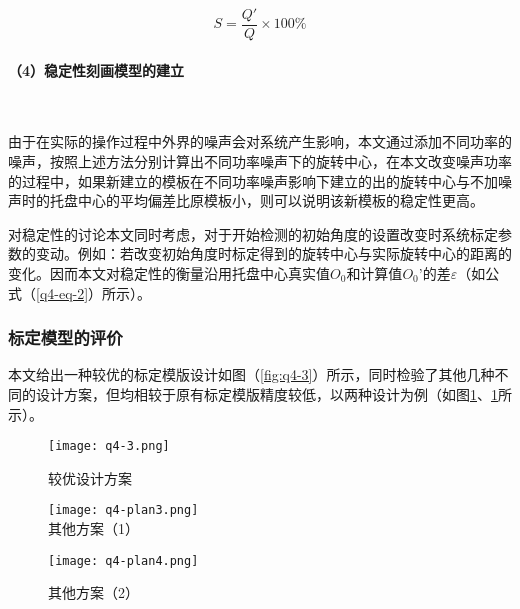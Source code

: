 \documentclass[withoutpreface,bwprint]{cumcmthesis} %
\begin{document}
\begin{equation}
	\label{q4-eq-2}
	S = \frac{Q'}{Q} \times 100\%
\end{equation}

\paragraph*{（4）稳定性刻画模型的建立}~\\

\par 由于在实际的操作过程中外界的噪声会对系统产生影响，本文通过添加不同功率的噪声，按照上述方法分别计算出不同功率噪声下的旋转中心，在本文改变噪声功率的过程中，如果新建立的模板在不同功率噪声影响下建立的出的旋转中心与不加噪声时的托盘中心的平均偏差比原模板小，则可以说明该新模板的稳定性更高。
\par 对稳定性的讨论本文同时考虑，对于开始检测的初始角度的设置改变时系统标定参数的变动。例如：若改变初始角度时标定得到的旋转中心与实际旋转中心的距离的变化。因而本文对稳定性的衡量沿用托盘中心真实值$O_0$和计算值$O_0’$的差$\varepsilon$（如公式（\ref{q4-eq-2}）所示）。

\subsubsection{标定模型的评价}
本文给出一种较优的标定模版设计如图（\ref{fig:q4-3}）所示，同时检验了其他几种不同的设计方案，但均相较于原有标定模版精度较低，以两种设计为例（如图\ref{fig:q4-3-1}、\ref{fig:q4-3-1}所示）。

\begin{figure}[!htbp]  
\begin{minipage}[t]{0.3\textwidth}
\centering  
\texttt{[image: q4-3.png]}
\caption{较优设计方案} \label{fig:q4-3}
\end{minipage}
\hspace{1ex}
\begin{minipage}[t]{0.3\textwidth}
\centering  
\texttt{[image: q4-plan3.png]} \\
\caption{其他方案（1）} \label{fig:q4-3-1}
\end{minipage}
\hspace{1ex}
\begin{minipage}[t]{0.3\textwidth}  
\centering  
\texttt{[image: q4-plan4.png]}\\
\caption{其他方案（2）} \label{fig:q4-3-1}
\end{minipage}  
\end{figure} 
\end{document}

